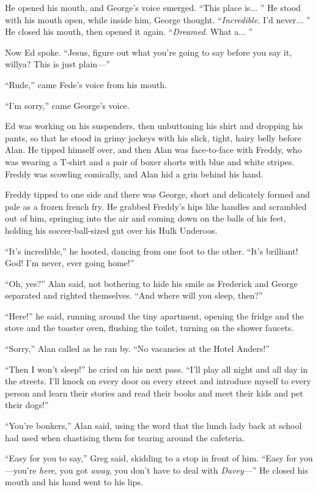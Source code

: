 \documentclass{article}
\begin{document}
He opened his mouth, and George's voice emerged.  ``This place is... 
'' He stood with his mouth open, while inside him, George thought. 
``\textit{Incredible.} I'd never...  '' He closed his mouth, then
opened it again.  ``\textit{Dreamed}.  What a...  ''

Now Ed spoke.  ``Jesus, figure out what you're going to say before you
say it, willya?  This is just plain---''

``Rude,'' came Fede's voice from his mouth.

``I'm sorry,'' came George's voice.

Ed was working on his suspenders, then unbuttoning his shirt and
dropping his pants, so that he stood in grimy jockeys with his slick,
tight, hairy belly before Alan.  He tipped himself over, and then Alan
was face-to-face with Freddy, who was wearing a T-shirt and a pair of
boxer shorts with blue and white stripes.  Freddy was scowling
comically, and Alan hid a grin behind his hand.

Freddy tipped to one side and there was George, short and delicately
formed and pale as a frozen french fry.  He grabbed Freddy's hips like
handles and scrambled out of him, springing into the air and coming
down on the balls of his feet, holding his soccer-ball-sized gut over
his Hulk Underoos.

``It's incredible,'' he hooted, dancing from one foot to the other. 
``It's brilliant!  God!  I'm never, ever going home!''

``Oh, yes?'' Alan said, not bothering to hide his smile as Frederick
and George separated and righted themselves.  ``And where will you
sleep, then?''

``Here!'' he said, running around the tiny apartment, opening the
fridge and the stove and the toaster oven, flushing the toilet,
turning on the shower faucets.

``Sorry,'' Alan called as he ran by.  ``No vacancies at the Hotel
Anders!''

``Then I won't sleep!'' he cried on his next pass.  ``I'll play all
night and all day in the streets.  I'll knock on every door on every
street and introduce myself to every person and learn their stories
and read their books and meet their kids and pet their dogs!''

``You're bonkers,'' Alan said, using the word that the lunch lady back
at school had used when chastising them for tearing around the
cafeteria.

``Easy for you to say,'' Greg said, skidding to a stop in front of
him.  ``Easy for you---you're \textit{here}, you got \textit{away},
you don't have to deal with \textit{Davey}---'' He closed his mouth
and his hand went to his lips.
\end{document}
